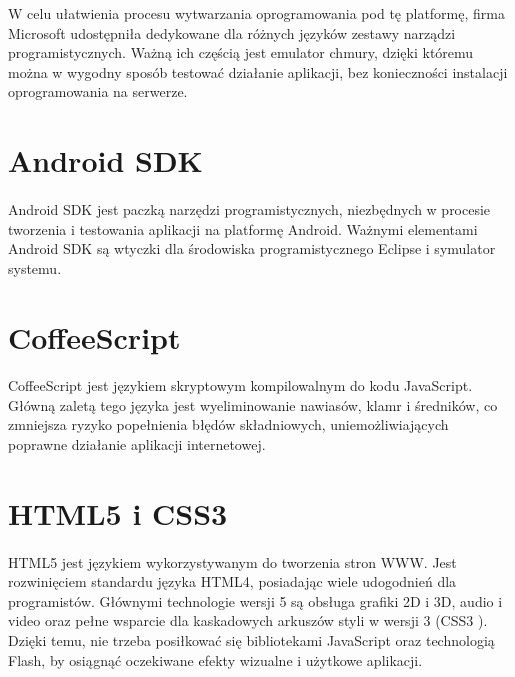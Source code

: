 W celu ułatwienia procesu wytwarzania oprogramowania pod tę platformę, firma Microsoft udostępniła dedykowane dla różnych języków zestawy narządzi programistycznych. Ważną ich częścią jest emulator chmury, dzięki któremu można w wygodny sposób testować działanie aplikacji, bez konieczności instalacji oprogramowania na serwerze.

\section{Android SDK} %
\label{sec:android_sdk}

\paragraph{} %
\label{par:}

Android SDK \cite{and1} \cite{and2} \cite{android1} \cite{android2} jest paczką narzędzi programistycznych, niezbędnych w procesie tworzenia i testowania aplikacji na platformę Android. Ważnymi elementami Android SDK są wtyczki dla środowiska programistycznego Eclipse i symulator systemu.

\section{CoffeeScript} %
\label{sec:coffeescript}
\paragraph{} %
\label{par:}

CoffeeScript \cite{coffee} jest językiem skryptowym kompilowalnym do kodu JavaScript. Główną zaletą tego języka jest wyeliminowanie nawiasów, klamr i średników, co zmniejsza ryzyko popełnienia błędów składniowych, uniemożliwiających poprawne działanie aplikacji internetowej.

\section{HTML5 i CSS3} %
\label{par:html5_i_css3}
\paragraph{} %
\label{par:}
HTML5 \cite{html5} jest językiem wykorzystywanym do tworzenia stron WWW. Jest rozwinięciem standardu języka HTML4, posiadając wiele udogodnień dla programistów. Głównymi technologie wersji 5 są obsługa grafiki 2D i 3D, audio i video oraz pełne wsparcie dla kaskadowych arkuszów styli w wersji 3 (CSS3 \cite{css3}). Dzięki temu, nie trzeba posiłkować się bibliotekami JavaScript oraz technologią Flash, by osiągnąć oczekiwane efekty wizualne i użytkowe aplikacji.


